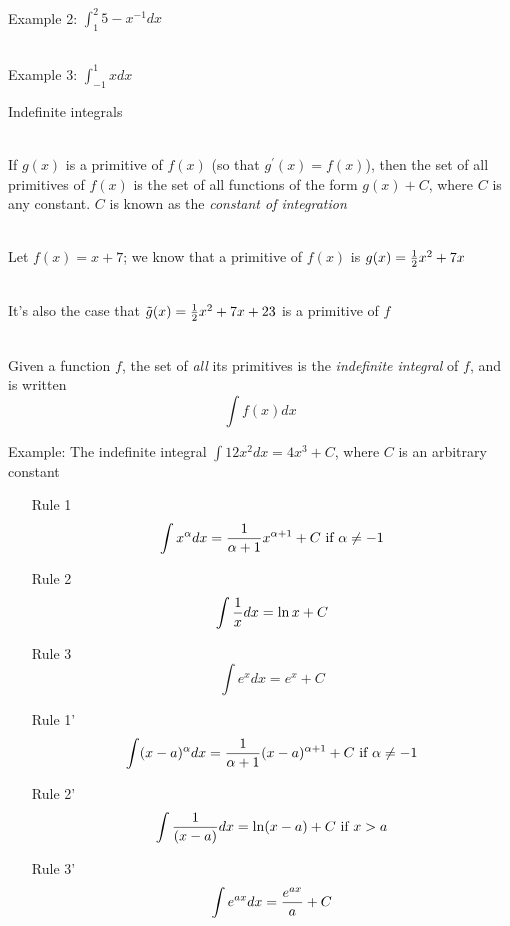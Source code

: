 \documentclass[10pt]{seminar}
\begin{document}
\begin{slide}
\ \\Example 2: $\int_1^2 5-x^{-1} dx$

\ \\Example 3: $\int_{-1}^1 x dx$

\newslide
Indefinite integrals

\ \\If $g(x)$ is a primitive of $f(x)$ (so that $g^\prime(x)=f(x)$), then the set of all primitives of $f(x) $ is the set of all functions of the form $g(x)+C$, where $C$ is any constant.  $C$ is known as the \textit{constant of integration}

\ \\Let $f(x)=x+7$; we know that a primitive of $f(x)$ is $g(x)={1\over 2}x^2+7x$

\ \\It's also the case that $\tilde{g}(x)={1\over 2}x^2+7x+23$ is a primitive of $f$

\ \\Given a function $f$, the set of \textit{all} its primitives is the \textit{indefinite integral} of $f$, and is written $$\int f(x) dx$$

\newslide

Example: The indefinite integral  $\int 12x^2 dx=4x^3+C$, where $C$ is an arbitrary constant

\vspace{.2in}

\begin{itemize}
\item [Rule 1] $$\int x^\alpha dx={{1}\over{\alpha+1}}x^{\alpha+1}+C \hbox{ if }\alpha\not=-1$$

\item [Rule 2] $$\int {1\over x} dx=\ln x+C $$

\item [Rule 3] $$\int e^x dx =e^x +C$$

\end{itemize}

\newslide 

\begin{itemize}
\item [Rule 1'] $$\int (x-a)^\alpha dx={{1}\over{\alpha+1}}(x-a)^{\alpha+1}+C \hbox{ if }\alpha\not=-1$$

\item [Rule 2'] $$\int {1\over {(x-a)}} dx=\ln (x-a)+C \hbox{ if }x>a$$

\item [Rule 3'] $$\int e^{ax} dx ={{e^{ax}}\over{a}} +C$$


\end{itemize}
\end{slide}
\end{document}
